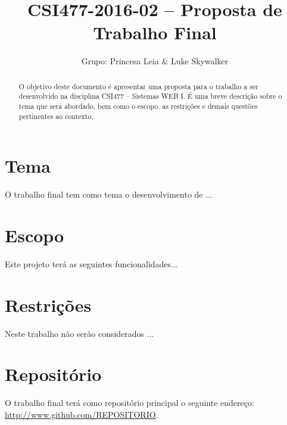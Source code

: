 \documentclass[10pt,a4paper,article]{abntex2}
\author{Grupo: Princesa Leia \& Luke Skywalker}
\title{CSI477-2016-02 -- Proposta de Trabalho Final}
\begin{document}
	\maketitle

	\begin{abstract}
		O objetivo deste documento é apresentar uma proposta para o trabalho a ser desenvolvido na disciplina CSI477 -- Sistemas WEB I. É uma breve descrição sobre o tema que será abordado, bem como o escopo, as restrições e demais questões pertinentes ao contexto.
	\end{abstract}		
	
	\section{Tema}
	
		O trabalho final tem como tema o desenvolvimento de ...
	
	\section{Escopo}
	
		Este projeto terá as seguintes funcionalidades...

	\section{Restrições}

		Neste trabalho não serão considerados ...

	\section{Repositório}

		O trabalho final terá como repositório principal o seguinte endereço: \url{http://www.github.com/REPOSITORIO}.

\end{document}
